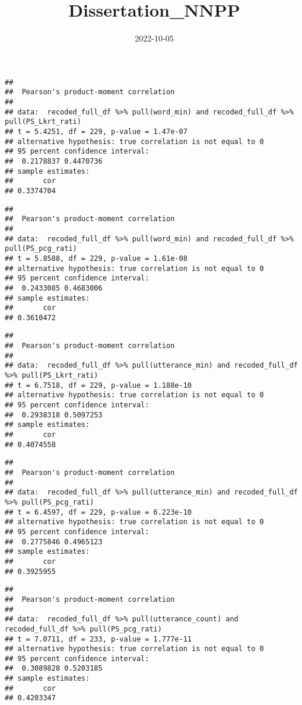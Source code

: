 \documentclass[
]{article}
\title{Dissertation\_NNPP}
\author{}
\date{\vspace{-2.5em}2022-10-05}
\begin{document}
\maketitle

\begin{verbatim}
## 
##  Pearson's product-moment correlation
## 
## data:  recoded_full_df %>% pull(word_min) and recoded_full_df %>% pull(PS_Lkrt_rati)
## t = 5.4251, df = 229, p-value = 1.47e-07
## alternative hypothesis: true correlation is not equal to 0
## 95 percent confidence interval:
##  0.2178837 0.4470736
## sample estimates:
##       cor 
## 0.3374704
\end{verbatim}

\begin{verbatim}
## 
##  Pearson's product-moment correlation
## 
## data:  recoded_full_df %>% pull(word_min) and recoded_full_df %>% pull(PS_pcg_rati)
## t = 5.8588, df = 229, p-value = 1.61e-08
## alternative hypothesis: true correlation is not equal to 0
## 95 percent confidence interval:
##  0.2433085 0.4683006
## sample estimates:
##       cor 
## 0.3610472
\end{verbatim}

\begin{verbatim}
## 
##  Pearson's product-moment correlation
## 
## data:  recoded_full_df %>% pull(utterance_min) and recoded_full_df %>% pull(PS_Lkrt_rati)
## t = 6.7518, df = 229, p-value = 1.188e-10
## alternative hypothesis: true correlation is not equal to 0
## 95 percent confidence interval:
##  0.2938318 0.5097253
## sample estimates:
##       cor 
## 0.4074558
\end{verbatim}

\begin{verbatim}
## 
##  Pearson's product-moment correlation
## 
## data:  recoded_full_df %>% pull(utterance_min) and recoded_full_df %>% pull(PS_pcg_rati)
## t = 6.4597, df = 229, p-value = 6.223e-10
## alternative hypothesis: true correlation is not equal to 0
## 95 percent confidence interval:
##  0.2775846 0.4965123
## sample estimates:
##       cor 
## 0.3925955
\end{verbatim}

\begin{verbatim}
## 
##  Pearson's product-moment correlation
## 
## data:  recoded_full_df %>% pull(utterance_count) and recoded_full_df %>% pull(PS_pcg_rati)
## t = 7.0711, df = 233, p-value = 1.777e-11
## alternative hypothesis: true correlation is not equal to 0
## 95 percent confidence interval:
##  0.3089828 0.5203185
## sample estimates:
##       cor 
## 0.4203347
\end{verbatim}
\end{document}
